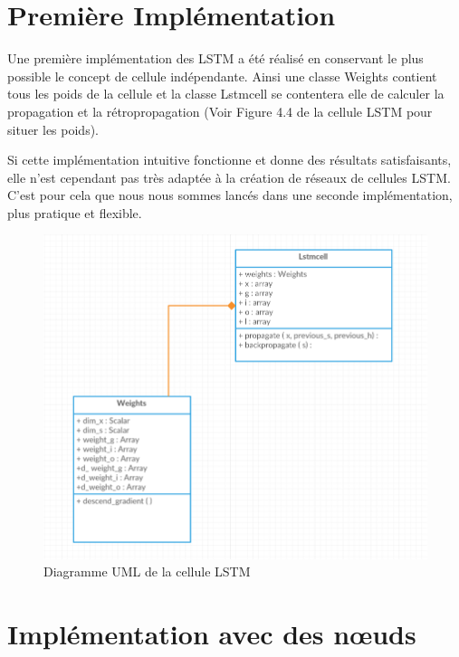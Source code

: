 \section{Première Implémentation}

Une première implémentation des LSTM a été réalisé en conservant le plus possible le concept de cellule indépendante. Ainsi une classe Weights contient tous les poids de la cellule et la classe Lstmcell se contentera elle de calculer la propagation et la rétropropagation (Voir Figure 4.4 de la cellule LSTM pour situer les poids).

Si cette implémentation intuitive fonctionne et donne des résultats satisfaisants, elle n'est cependant pas très adaptée à la création de réseaux de cellules LSTM. C'est pour cela que nous nous sommes lancés dans une seconde implémentation, plus pratique et flexible.

\begin{figure}[h!]
\begin{center}
\includegraphics[scale=0.8]{images/chapter6/UML_LSTM_Implementation_1.png}
\caption{Diagramme UML de la cellule LSTM}
\label{cellule LSTM UML 1}
\end{center}
\end{figure}

\section{Implémentation avec des nœuds}

